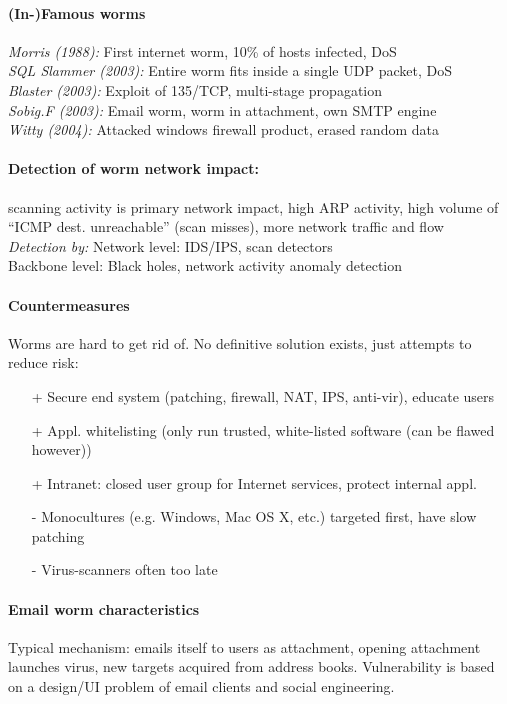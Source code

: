 \paragraph{(In-)Famous worms} \emph{Morris (1988):} First internet worm, 10\% of hosts infected, DoS \\
\emph{SQL Slammer (2003):} Entire worm fits inside a single UDP packet, DoS \\
\emph{Blaster (2003):} Exploit of 135/TCP, multi-stage propagation \\
\emph{Sobig.F (2003):} Email worm, worm in attachment, own SMTP engine\\
\emph{Witty (2004):} Attacked windows firewall product, erased random data

\paragraph{Detection of worm network impact:} scanning activity is primary network impact, high ARP activity, high volume of ``ICMP dest. unreachable'' (scan
misses), more network traffic and flow \\
\emph{Detection by:} Network level: IDS/IPS, scan detectors \\
Backbone level: Black holes, network activity anomaly detection

\paragraph{Countermeasures} Worms are hard to get rid of. No definitive solution exists, just attempts to reduce risk:
\begin{itemize}
\item[+] Secure end system (patching, firewall, NAT, IPS, anti-vir), educate users
\item[+] Appl. whitelisting (only run trusted, white-listed software (can be flawed however))
\item[+] Intranet: closed user group for Internet services, protect internal appl. 
\item[-] Monocultures (e.g. Windows, Mac OS X, etc.) targeted first, have slow patching
\item[-] Virus-scanners often too late
\end{itemize}

\paragraph{Email worm characteristics} Typical mechanism: emails itself to users as attachment, opening attachment launches virus, new targets acquired from address books. Vulnerability is based on a design/UI problem of email clients and social engineering.

